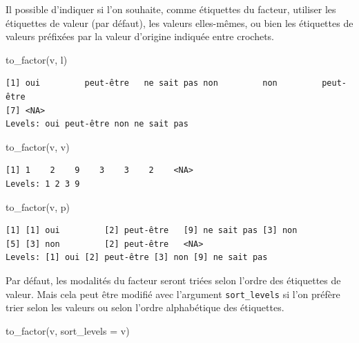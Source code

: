 \documentclass[
  letterpaper,
  DIV=11,
  numbers=noendperiod,
  oneside]{scrreprt}
\newenvironment{Shaded}{\begin{snugshade}}{\end{snugshade}}
\newcommand{\AttributeTok}[1]{\textcolor[rgb]{0.40,0.45,0.13}{#1}}
\newcommand{\FunctionTok}[1]{\textcolor[rgb]{0.28,0.35,0.67}{#1}}
\newcommand{\NormalTok}[1]{\textcolor[rgb]{0.00,0.23,0.31}{#1}}
\newcommand{\StringTok}[1]{\textcolor[rgb]{0.13,0.47,0.30}{#1}}
\begin{document}
Il possible d'indiquer si l'on souhaite, comme étiquettes du facteur,
utiliser les étiquettes de valeur (par défaut), les valeurs elles-mêmes,
ou bien les étiquettes de valeurs préfixées par la valeur d'origine
indiquée entre crochets.

\begin{Shaded}
\begin{Highlighting}[]
\FunctionTok{to\_factor}\NormalTok{(v, }\StringTok{\textquotesingle{}l\textquotesingle{}}\NormalTok{)}
\end{Highlighting}
\end{Shaded}

\begin{verbatim}
[1] oui         peut-être   ne sait pas non         non         peut-être  
[7] <NA>       
Levels: oui peut-être non ne sait pas
\end{verbatim}

\begin{Shaded}
\begin{Highlighting}[]
\FunctionTok{to\_factor}\NormalTok{(v, }\StringTok{\textquotesingle{}v\textquotesingle{}}\NormalTok{)}
\end{Highlighting}
\end{Shaded}

\begin{verbatim}
[1] 1    2    9    3    3    2    <NA>
Levels: 1 2 3 9
\end{verbatim}

\begin{Shaded}
\begin{Highlighting}[]
\FunctionTok{to\_factor}\NormalTok{(v, }\StringTok{\textquotesingle{}p\textquotesingle{}}\NormalTok{)}
\end{Highlighting}
\end{Shaded}

\begin{verbatim}
[1] [1] oui         [2] peut-être   [9] ne sait pas [3] non        
[5] [3] non         [2] peut-être   <NA>           
Levels: [1] oui [2] peut-être [3] non [9] ne sait pas
\end{verbatim}

Par défaut, les modalités du facteur seront triées selon l'ordre des
étiquettes de valeur. Mais cela peut être modifié avec l'argument
\texttt{sort\_levels} si l'on préfère trier selon les valeurs ou selon
l'ordre alphabétique des étiquettes.

\begin{Shaded}
\begin{Highlighting}[]
\FunctionTok{to\_factor}\NormalTok{(v, }\AttributeTok{sort\_levels =} \StringTok{\textquotesingle{}v\textquotesingle{}}\NormalTok{)}
\end{Highlighting}
\end{Shaded}
\end{document}
